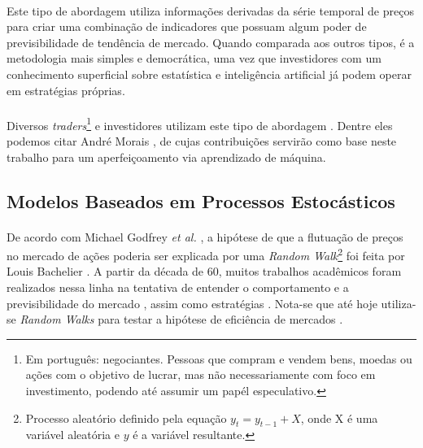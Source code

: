\paragraph{} Este tipo de abordagem utiliza informações derivadas da série temporal de preços para criar uma combinação de indicadores que possuam algum poder de previsibilidade de tendência de mercado. Quando comparada aos outros tipos, é a metodologia mais simples e democrática, uma vez que investidores com um conhecimento superficial sobre estatística e inteligência artificial já podem operar em estratégias próprias.

\paragraph{} Diversos \textit{traders}\footnote{Em português: negociantes. Pessoas que compram e vendem bens, moedas ou ações com o objetivo de lucrar, mas não necessariamente com foco em investimento, podendo até assumir um papél especulativo.} e investidores utilizam este tipo de abordagem \cite{ijegwa2014predictive}. Dentre eles podemos citar André Morais \cite{moraes2007se}, de cujas contribuições servirão como base neste trabalho para um aperfeiçoamento via aprendizado de máquina.



\FloatBarrier
\subsection{Modelos Baseados em Processos Estocásticos}

\paragraph{} De acordo com Michael Godfrey \textit{et al.} \cite{godfrey1964random}, a hipótese de que a flutuação de preços no mercado de ações poderia ser explicada por uma \textit{Random Walk}\footnote{Processo aleatório definido pela equação \begin{math}y_t = y_{t-1} + X\end{math}, onde X é uma variável aleatória e \(y\) é a variável resultante.} foi feita por Louis Bachelier \cite{bachelier1900theorie}. A partir da década de 60, muitos trabalhos acadêmicos foram realizados nessa linha na tentativa de entender o comportamento e a previsibilidade do mercado \cite{fama1970efficient, solnik1973note, cooper1982world}, assim como estratégias \cite{malkiel2019random}. Nota-se que até hoje utiliza-se \textit{Random Walks} para testar a hipótese de eficiência de mercados \cite{said2015efficiency}.

